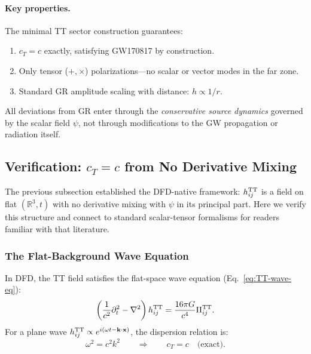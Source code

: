 \paragraph{Key properties.}
The minimal TT sector construction guarantees:
\begin{enumerate}
\item $c_T = c$ exactly, satisfying GW170817 by construction.
\item Only tensor ($+, \times$) polarizations---no scalar or vector modes in the far zone.
\item Standard GR amplitude scaling with distance: $h \propto 1/r$.
\end{enumerate}

All deviations from GR enter through the \textit{conservative source dynamics} governed by the scalar field $\psi$, not through modifications to the GW propagation or radiation itself.

\subsection{Verification: $c_T = c$ from No Derivative Mixing}\label{sec:gw-ct-proof}

The previous subsection established the DFD-native framework: $h_{ij}^{\rm TT}$ is a field on flat $(\mathbb{R}^3, t)$ with no derivative mixing with $\psi$ in its principal part. Here we verify this structure and connect to standard scalar-tensor formalisms for readers familiar with that literature.

\subsubsection{The Flat-Background Wave Equation}

In DFD, the TT field satisfies the flat-space wave equation (Eq.~\ref{eq:TT-wave-eq}):
\begin{equation}
\left(\frac{1}{c^2}\partial_t^2 - \nabla^2\right)h_{ij}^{\rm TT} = \frac{16\pi G}{c^4}\Pi_{ij}^{\rm TT}.
\end{equation}
For a plane wave $h_{ij}^{\rm TT} \propto e^{i(\omega t - \mathbf{k}\cdot\mathbf{x})}$, the dispersion relation is:
\begin{equation}\label{eq:dispersion-exact}
\omega^2 = c^2 k^2 \qquad \Rightarrow \qquad c_T = c \quad \text{(exact)}.
\end{equation}

